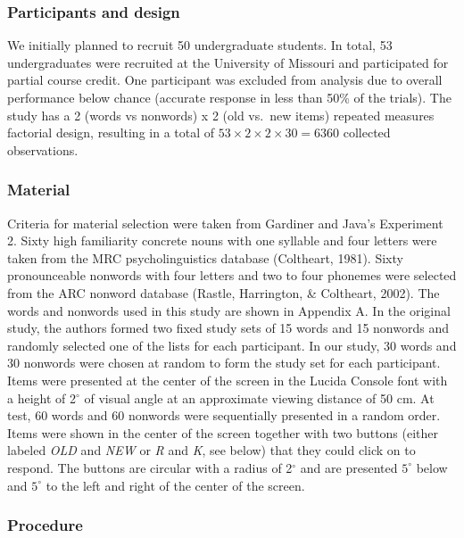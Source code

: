 \documentclass[english,,man]{apa6}
\begin{document}
\hypertarget{participants-and-design}{%
\subsubsection{Participants and design}\label{participants-and-design}}

We initially planned to recruit 50 undergraduate students. In total, 53 undergraduates were recruited at the University of Missouri and participated for partial course credit. One participant was excluded from analysis due to overall performance below chance (accurate response in less than 50\% of the trials). The study has a 2 (words vs nonwords) x 2 (old vs.~new items) repeated measures factorial design, resulting in a total of \(53 \times 2 \times 2 \times 30 = 6360\) collected observations.

\hypertarget{material}{%
\subsubsection{Material}\label{material}}

Criteria for material selection were taken from Gardiner and Java's Experiment 2. Sixty high familiarity concrete nouns with one syllable and four letters were taken from the MRC psycholinguistics database (Coltheart, 1981). Sixty pronounceable nonwords with four letters and two to four phonemes were selected from the ARC nonword database (Rastle, Harrington, \& Coltheart, 2002). The words and nonwords used in this study are shown in Appendix A. In the original study, the authors formed two fixed study sets of 15 words and 15 nonwords and randomly selected one of the lists for each participant. In our study, 30 words and 30 nonwords were chosen at random to form the study set for each participant. Items were presented at the center of the screen in the Lucida Console font with a height of 2\(^{\circ}\) of visual angle at an approximate viewing distance of 50 cm. At test, 60 words and 60 nonwords were sequentially presented in a random order. Items were shown in the center of the screen together with two buttons (either labeled \emph{OLD} and \emph{NEW} or \emph{R} and \emph{K}, see below) that they could click on to respond. The buttons are circular with a radius of 2\(^{\circ}\) and are presented \(5^{\circ}\) below and \(5^{\circ}\) to the left and right of the center of the screen.

\hypertarget{procedure}{%
\subsubsection{Procedure}\label{procedure}}
\end{document}
